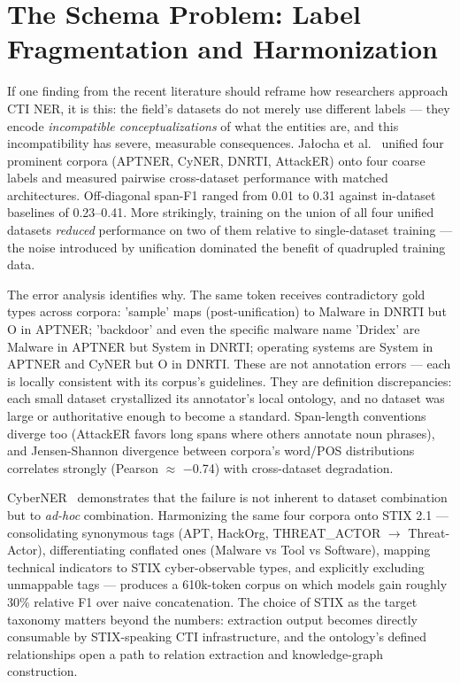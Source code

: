 \documentclass[11pt]{article}
\begin{document}
\section{The Schema Problem: Label Fragmentation and Harmonization}

If one finding from the recent literature should reframe how researchers approach CTI NER, it is this: the field's datasets do not merely use different labels — they encode \emph{incompatible conceptualizations} of what the entities are, and this incompatibility has severe, measurable consequences. Ja\l{}ocha et al.~\citep{jalocha2025label} unified four prominent corpora (APTNER, CyNER, DNRTI, AttackER) onto four coarse labels and measured pairwise cross-dataset performance with matched architectures. Off-diagonal span-F1 ranged from 0.01 to 0.31 against in-dataset baselines of 0.23–0.41. More strikingly, training on the union of all four unified datasets \emph{reduced} performance on two of them relative to single-dataset training — the noise introduced by unification dominated the benefit of quadrupled training data.

The error analysis identifies why. The same token receives contradictory gold types across corpora: 'sample' maps (post-unification) to Malware in DNRTI but O in APTNER; 'backdoor' and even the specific malware name 'Dridex' are Malware in APTNER but System in DNRTI; operating systems are System in APTNER and CyNER but O in DNRTI. These are not annotation errors — each is locally consistent with its corpus's guidelines. They are definition discrepancies: each small dataset crystallized its annotator's local ontology, and no dataset was large or authoritative enough to become a standard. Span-length conventions diverge too (AttackER favors long spans where others annotate noun phrases), and Jensen-Shannon divergence between corpora's word/POS distributions correlates strongly (Pearson $\approx$ $-$0.74) with cross-dataset degradation.

CyberNER~\citep{echchammakhy2025cyberner} demonstrates that the failure is not inherent to dataset combination but to \emph{ad-hoc} combination. Harmonizing the same four corpora onto STIX 2.1 — consolidating synonymous tags (APT, HackOrg, THREAT\_ACTOR $\rightarrow$ Threat-Actor), differentiating conflated ones (Malware vs Tool vs Software), mapping technical indicators to STIX cyber-observable types, and explicitly excluding unmappable tags — produces a 610k-token corpus on which models gain roughly 30\% relative F1 over naive concatenation. The choice of STIX as the target taxonomy matters beyond the numbers: extraction output becomes directly consumable by STIX-speaking CTI infrastructure, and the ontology's defined relationships open a path to relation extraction and knowledge-graph construction.
\end{document}

